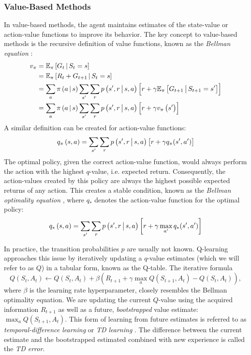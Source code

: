 \subsubsection{Value-Based Methods}
In value-based methods, the agent maintains estimates of the state-value or action-value functions to improve its behavior. The key concept to value-based methods is the recursive definition of value functions, known as the \textit{Bellman equation} \cite{bible}:
\begin{align*}
    v_\pi &= \mathbb{E}_\pi \left[G_t \,\middle|\, S_t = s\right] \\
          &= \mathbb{E}_\pi \left[R_t + G_{t+1} \,\middle|\, S_t = s\right] \\
          &= \sum_a \pi\left(a \,\middle|\, s\right) \sum_{s'} \sum_r p\left(s', r \,\middle|\, s, a\right) \left[r + \gamma \mathbb{E}_\pi\left[G_{t+1} \,\middle|\, S_{t+1} = s'\right]\right] \\
          &= \sum_a \pi\left(a \,\middle|\, s\right) \sum_{s'} \sum_r p\left(s', r \,\middle|\, s, a\right) \left[r + \gamma v_\pi\left(s'\right)\right]
\end{align*}
A similar definition can be created for action-value functions:
\begin{equation*}
    q_\pi\left(s, a\right) = \sum_{s'} \sum_r p\left(s', r \,\middle|\, s, a\right) \left[r + \gamma q_\pi(s', a')\right]
\end{equation*}
The optimal policy, given the correct action-value function, would always perform the action with the highest $q$-value, i.e. expected return. Consequently, the action-values created by this policy are always the highest possible expected returns of any action. This creates a stable condition, known as the \textit{Bellman optimality equation} \cite{bible}, where $q_*$ denotes the action-value function for the optimal policy:
\begin{equation*}
    q_*\left(s, a\right) = \sum_{s'} \sum_r p\left(s', r \,\middle|\, s, a\right) \left[r + \gamma \max_{a'} q_*(s', a')\right]
\end{equation*}

In practice, the transition probabilities $p$ are usually not known. Q-learning \cite{q-learning} approaches this issue by iteratively updating a $q$-value estimates (which we will refer to as $Q$) in a tabular form, known as the Q-table. The iterative formula
\begin{equation*}
    Q\left(S_t, A_t\right) \gets Q\left(S_t, A_t\right) + \beta\left(R_{t+1} + \gamma \max_a Q\left(S_{t+1}, A_t\right) - Q\left(S_t, A_t\right)\right),
\end{equation*}
where $\beta$ is the learning rate hyperparameter, closely resembles the Bellman optimality equation. We are updating the current $Q$-value using the acquired information $R_{t+1}$ as well as a future, \textit{bootstrapped} value estimate: $\max_a Q\left(S_{t+1}, A_t\right)$. This form of learning from future estimates is referred to as \textit{temporal-difference learning} or \textit{TD learning} \cite{td-learning}. The difference between the current estimate and the bootstrapped estimated combined with new experience is called the \textit{TD error}.

